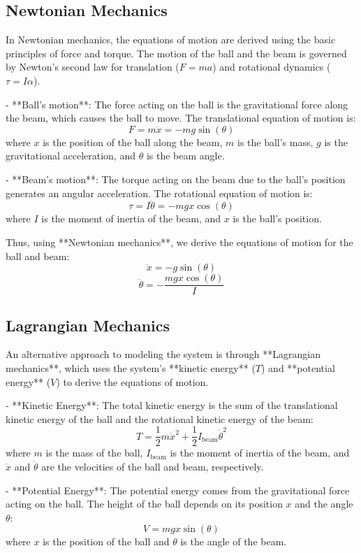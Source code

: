 \documentclass[conference]{IEEEtran}
\begin{document}
\subsection{Newtonian Mechanics}
In Newtonian mechanics, the equations of motion are derived using the basic principles of force and torque. The motion of the ball and the beam is governed by Newton's second law for translation (\(F = ma\)) and rotational dynamics (\(\tau = I \alpha\)).

- **Ball's motion**: The force acting on the ball is the gravitational force along the beam, which causes the ball to move. The translational equation of motion is:
  \[
  F = m \ddot{x} = - m g \sin(\theta)
  \]
  where \(x\) is the position of the ball along the beam, \(m\) is the ball's mass, \(g\) is the gravitational acceleration, and \(\theta\) is the beam angle.

- **Beam's motion**: The torque acting on the beam due to the ball's position generates an angular acceleration. The rotational equation of motion is:
  \[
  \tau = I \ddot{\theta} = - m g x \cos(\theta)
  \]
  where \(I\) is the moment of inertia of the beam, and \(x\) is the ball's position.

Thus, using **Newtonian mechanics**, we derive the equations of motion for the ball and beam:
\[
\ddot{x} = - g \sin(\theta)
\]
\[
\ddot{\theta} = - \frac{m g x \cos(\theta)}{I}
\]

\subsection{Lagrangian Mechanics}
An alternative approach to modeling the system is through **Lagrangian mechanics**, which uses the system's **kinetic energy** (\(T\)) and **potential energy** (\(V\)) to derive the equations of motion.

- **Kinetic Energy**: The total kinetic energy is the sum of the translational kinetic energy of the ball and the rotational kinetic energy of the beam:
  \[
  T = \frac{1}{2} m \dot{x}^2 + \frac{1}{2} I_{\text{beam}} \dot{\theta}^2
  \]
  where \(m\) is the mass of the ball, \(I_{\text{beam}}\) is the moment of inertia of the beam, and \(\dot{x}\) and \(\dot{\theta}\) are the velocities of the ball and beam, respectively.

- **Potential Energy**: The potential energy comes from the gravitational force acting on the ball. The height of the ball depends on its position \(x\) and the angle \(\theta\):
  \[
  V = m g x \sin(\theta)
  \]
  where \(x\) is the position of the ball and \(\theta\) is the angle of the beam.
\end{document}
